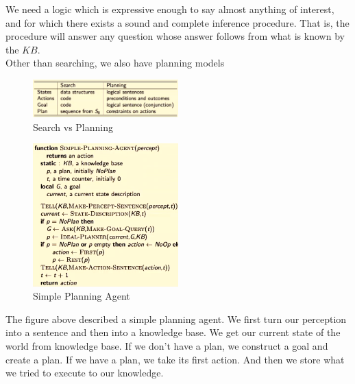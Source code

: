 \documentclass[a4paper]{article}
\theoremstyle{plain}
\theoremstyle{definition}
\theoremstyle{remark}
\begin{document}
We need a logic which is expressive enough to say almost anything of interest, and for which there exists a sound and complete inference procedure. That is, the procedure will answer any question whose answer follows from what is known by the $KB$.\\
Other than searching, we also have planning models
\begin{figure}[H]
	\centering
	\includegraphics[width=0.5\textwidth]{ten.png}
	\caption{Search vs Planning}
	\label{fig:ten-png}
\end{figure}
\begin{figure}[H]
	\centering
	\includegraphics[width=0.5\textwidth]{eleven.png}
	\caption{Simple Planning Agent}
	\label{fig:eleven-png}
\end{figure}
The figure above described a simple planning agent. We first turn our perception into a sentence and then into a knowledge base. We get our current state of the world from knowledge base. If we don't have a plan, we construct a goal and create a plan. If we have a plan, we take its first action. And then we store what we tried to execute to our knowledge.
\end{document}
